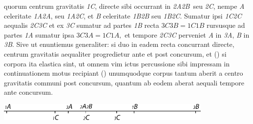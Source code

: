 \protect{}%
\protect{}
quorum centrum gravitatis \textit{{\scriptsize1}C},%
\protect{}
directe sibi occurrant in
\lbrack\textit{{\scriptsize2}A{\scriptsize2}B}\rbrack\
seu \textit{{\scriptsize2}C},
nempe \textit{A} celeritate \textit{{\scriptsize1}A{\scriptsize2}A},
seu \textit{{\scriptsize1}A{\scriptsize2}C},
et \textit{B} celeritate \textit{{\scriptsize1}B{\scriptsize2}B}
seu \textit{{\scriptsize1}B{\scriptsize2}C}.
Sumatur ipsi \textit{{\scriptsize1}C{\scriptsize2}C}
aequalis \textit{{\scriptsize2}C{\scriptsize3}C}%
%
et ex \textit{{\scriptsize3}C}
sumatur
ad partes \textit{{\scriptsize1}B}
recta ${\scriptstyle\textit{3}}C {\scriptstyle\textit{3}}B
= {\scriptstyle\textit{1}}C{\scriptstyle\textit{1}}B$
rursusque
ad partes \textit{{\scriptsize1}A}
sumatur
ipsa ${\scriptstyle\textit{3}}C {\scriptstyle\textit{3}}A
={\scriptstyle\textit{1}}C{\scriptstyle\textit{1}}A,$
et tempore \textit{{\scriptsize2}C{\scriptsize3}C}
perveniet \textit{A} in \textit{{\scriptsize3}A},
\textit{B} in \textit{{\scriptsize3}B}.
Sive ut enuntiemus generaliter:
si duo
%
%
in eadem recta
%
%
concurrant directe,%
\protect{}%
\protect{}
centrum gravitatis%
\protect{}
aequaliter progredietur ante et post concursum,%
\protect{}
et
(\protect\vphantom)%
si corpora ita elastica sint,%
\protect{}
ut omnem vim ictus%
\protect{}
percussione sibi impressam%
\protect{}
in continuationem motus%
\protect{}
recipiant%
\protect\vphantom()
unumquodque corpus tantum aberit a centro gravitatis%
\protect{}
communi post concursum,
quantum ab eodem aberat aequali tempore ante concursum.%
\protect{}
\pend%
 \vspace{2.5em}%
  \centerline{\includegraphics[width=0.8\textwidth]{gesamttex/edit_VIII,3/images/LH_35_09_21_001-002_d1.pdf}}%
